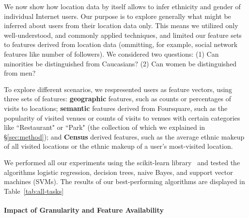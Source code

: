 
We now show how location data by itself allows to infer ethnicity and gender of individual Internet users.
Our purpose is to explore generally what might be inferred about users from their location data only.
This means we utilized only well-understood, and commonly applied techniques, and limited our feature sets to features derived from location data (ommitting, for example, social network features like number of followers).
We considered two questions: (1) Can minorities be distinguished from Caucasians? (2) Can women be distinguished from men?

To explore different scenarios, we respresented users as feature vectors, using three sets of features:
\textbf{geographic} features, such as counts or percentages of visits to locations; 
\textbf{semantic} features derived from Foursquare, such as the popularity of visited venues or counts of visits to venues with certain categories like ``Restaurant" or ``Park" (the collection of which we explained in \S\ref{sec:method}); 
and \textbf{Census} derived features, such as the average ethnic makeup of all visited locations or the ethnic makeup of a user's most-visited location.

We performed all our experiments using the scikit-learn library~\cite{scikit-learn} and tested the algorithms logistic regression, decision trees, naive Bayes, and support vector machines (SVMs). 
The results of our best-performing algorithms are displayed in Table~\ref{tab:all-tasks}


\paragraph{Impact of Granularity and Feature Availability}

